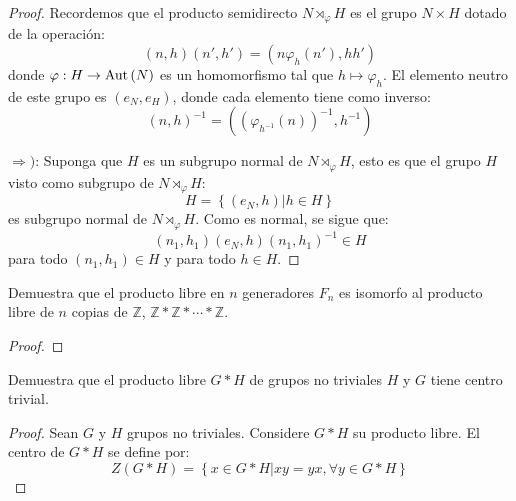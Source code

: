 \documentclass[12pt]{report}
\theoremstyle{largebreak}
\newcommand\cf[3]{\ensuremath{#1:#2\rightarrow#3}}
\newcommand{\Aut}[1]{\ensuremath{\textup{Aut}\left(#1\right)}}
\begin{document}
    \begin{proof}
        Recordemos que el producto semidirecto $N\rtimes_\varphi H$ es el grupo $N\times H$ dotado de la operación:
        \begin{equation*}
            (n,h)(n',h')=(n\varphi_h(n'),hh')
        \end{equation*}
        donde $\cf{\varphi}{H}{\Aut{N}}$ es un homomorfismo tal que $h\mapsto\varphi_h$. El elemento neutro de este grupo es $(e_N,e_H)$, donde cada elemento tiene como inverso:
        \begin{equation*}
            (n,h)^{-1}=\left((\varphi_{h^{-1}}(n))^{-1},h^{-1}\right)
        \end{equation*}

        $\Rightarrow)$: Suponga que $H$ es un subgrupo normal de $N\rtimes_\varphi H$, esto es que el grupo $H$ visto como subgrupo de $N\rtimes_\varphi H$:
        \begin{equation*}
            H=\left\{(e_N,h)\Big|h\in H \right\}
        \end{equation*}
        es subgrupo normal de $N\rtimes_\varphi H$. Como es normal, se sigue que:
        \begin{equation*}
            (n_1,h_1)(e_N,h)(n_1,h_1)^{-1}\in H
        \end{equation*}
        para todo $(n_1,h_1)\in H$ y para todo $h\in H$.
    \end{proof}

    \begin{excer}
        Demuestra que el producto libre en $n$ generadores $F_n$ es isomorfo al producto libre de $n$ copias de $\mathbb{Z}$, $\mathbb{Z}*\mathbb{Z}*\cdots*\mathbb{Z}$.
    \end{excer}

    \begin{proof}
        
    \end{proof}

    \begin{excer}
        Demuestra que el producto libre $G*H$ de grupos no triviales $H$ y $G$ tiene centro trivial.
    \end{excer}

    \begin{proof}
        Sean $G$ y $H$ grupos no triviales. Considere $G*H$ su producto libre. El centro de $G*H$ se define por:
        \begin{equation*}
            Z(G*H)=\left\{x\in G*H\Big|xy=yx,\forall y\in G*H \right\}
        \end{equation*}
    \end{proof}
\end{document}
